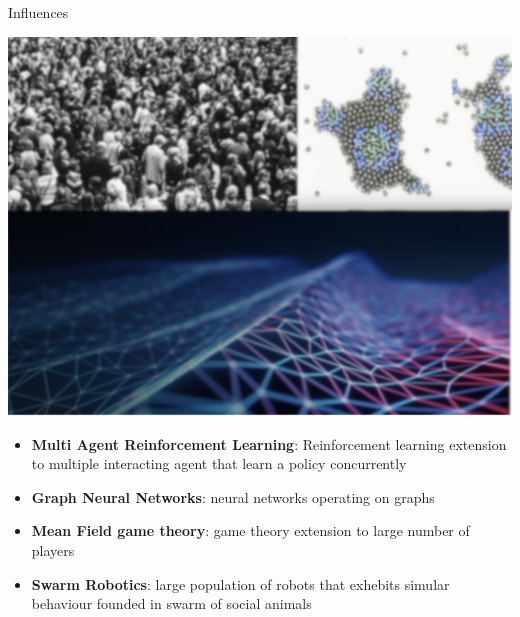 \begin{frame}{\playfairblack Influences}
  \begin{backgroundblock} 
    \includegraphics[width=\paperwidth]{img/background} 
  \end{backgroundblock} 
  \begin{card}
    \begin{itemize}
      \item \textbf{Multi Agent Reinforcement Learning}: Reinforcement learning extension to multiple interacting agent that learn a policy concurrently
      \item \textbf{Graph Neural Networks}: neural networks operating on graphs
      \item \textbf{Mean Field game theory}: game theory extension to large number of players
      \item \textbf{Swarm Robotics}: large population of robots that exhebits simular behaviour founded in swarm of social animals
    \end{itemize}
  \end{card}
\end{frame}